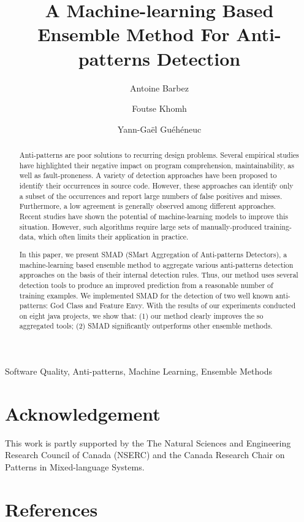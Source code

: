 \documentclass[final,2p,times,twocolumn]{elsarticle}
\begin{document}
\begin{frontmatter}
\title{A Machine-learning Based Ensemble Method For Anti-patterns Detection}

\author[poly]{Antoine Barbez}

\author[poly]{Foutse Khomh}

\author[concordia]{Yann-Gaël Guéhéneuc}

\address[poly]{Polytechnique Montreal}
\address[concordia]{Concordia University}

\begin{abstract}
Anti-patterns are poor solutions to recurring design problems. Several empirical studies have highlighted their negative impact on program comprehension, maintainability, as well as fault-proneness. A variety of detection approaches have been proposed to identify their occurrences in source code. However, these approaches can identify only a subset of the occurrences and report large numbers of false positives and misses. Furthermore, a low agreement is generally observed among different approaches. Recent studies have shown the potential of machine-learning models to improve this situation. However, such algorithms require large sets of manually-produced training-data, which often limits their application in practice. 

In this paper, we present SMAD (SMart Aggregation of Anti-patterns Detectors), a machine-learning based ensemble method to aggregate various anti-patterns detection approaches on the basis of their internal detection rules. Thus, our method uses several detection tools to produce an improved prediction from a reasonable number of training examples. We implemented SMAD for the detection of two well known anti-patterns: God Class and Feature Envy. With the results of our experiments conducted on eight java projects, we show that: (1) our method clearly improves the so aggregated tools; (2) SMAD significantly outperforms other ensemble methods.
\end{abstract}

\begin{keyword}
Software Quality, Anti-patterns, Machine Learning, Ensemble Methods
\end{keyword}

\end{frontmatter}








\section*{Acknowledgement}
This work is partly supported by the The Natural Sciences and Engineering Research Council of Canada (NSERC) and the Canada Research Chair on Patterns in Mixed-language Systems.
\section{References}
\balance


\end{document}
